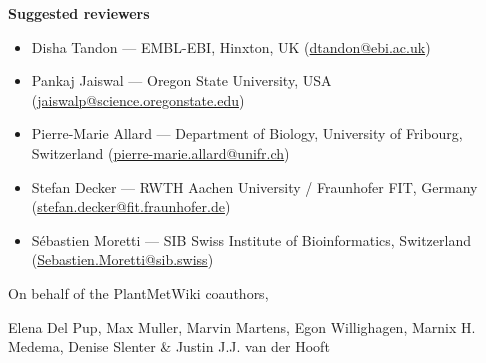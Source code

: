 \documentclass[11pt,a4paper]{article}
\begin{document}
\textbf{Suggested reviewers}
\begin{itemize}
  \setlength{\itemsep}{0.2em}
  \item Disha Tandon --- EMBL-EBI, Hinxton, UK
        (\href{mailto:dtandon@ebi.ac.uk}{dtandon@ebi.ac.uk})
  \item Pankaj Jaiswal --- Oregon State University, USA
        (\href{mailto:jaiswalp@science.oregonstate.edu}{jaiswalp@science.oregonstate.edu})
  \item Pierre-Marie Allard --- Department of Biology, University of Fribourg, Switzerland
        (\href{mailto:pierre-marie.allard@unifr.ch}{pierre-marie.allard@unifr.ch})
  \item Stefan Decker --- RWTH Aachen University / Fraunhofer FIT, Germany
        (\href{mailto:stefan.decker@fit.fraunhofer.de}{stefan.decker@fit.fraunhofer.de})
  \item S\'ebastien Moretti --- SIB Swiss Institute of Bioinformatics, Switzerland
        (\href{mailto:Sebastien.Moretti@sib.swiss}{Sebastien.Moretti@sib.swiss})
\end{itemize}

%
%
%


\vspace{1em}
On behalf of the PlantMetWiki coauthors,

\vspace{0.5em}
Elena Del Pup, Max Muller, Marvin Martens, Egon Willighagen, Marnix H. Medema,
Denise Slenter \& Justin J.J. van der Hooft
\end{document}
